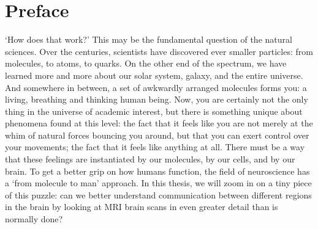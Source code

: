 \section*{Preface}
`How does that work?’ This may be the fundamental question of the natural sciences.
Over the centuries, scientists have discovered ever smaller particles: from molecules, to atoms, to quarks. On the other end of the spectrum, we have learned more and more about our solar system, galaxy, and the entire universe. And somewhere in between, a set of awkwardly arranged molecules forms you: a living, breathing and thinking human being.
Now, you are certainly not the only thing in the universe of academic interest, but there is something unique about phenomena found at this level: the fact that it feels like you are not merely at the whim of natural forces bouncing you around, but that you can exert control over your movements; the fact that it feels like anything at all. There must be a way that these feelings are instantiated by our molecules, by our cells, and by our brain.
To get a better grip on how humans function, the field of neuroscience has a ‘from molecule to man’ approach. In this thesis, we will zoom in on a tiny piece of this puzzle: can we better understand communication between different regions in the brain by looking at MRI brain scans in even greater detail than is normally done?
